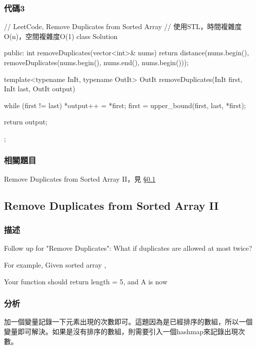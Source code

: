 \subsubsection{代碼3}
\begin{Code}
// LeetCode, Remove Duplicates from Sorted Array
// 使用STL，時間複雜度O(n)，空間複雜度O(1)
class Solution {
public:
    int removeDuplicates(vector<int>& nums) {
        return distance(nums.begin(), removeDuplicates(nums.begin(), nums.end(), nums.begin()));
    }

    template<typename InIt, typename OutIt>
    OutIt removeDuplicates(InIt first, InIt last, OutIt output) {
        while (first != last) {
            *output++ = *first;
            first = upper_bound(first, last, *first);
        }

        return output;
    }
};
\end{Code}


\subsubsection{相關題目}

\begindot
\item Remove Duplicates from Sorted Array II，見 \S \ref{sec:remove-duplicates-from-sorted-array-ii}
\myenddot


\subsection{Remove Duplicates from Sorted Array II}
\label{sec:remove-duplicates-from-sorted-array-ii}


\subsubsection{描述}
Follow up for "Remove Duplicates":
What if duplicates are allowed at most twice?

For example,
Given sorted array ,

Your function should return length = 5, and A is now \code{\[1,1,2,2,3\]}


\subsubsection{分析}
加一個變量記錄一下元素出現的次數即可。這題因為是已經排序的數組，所以一個變量即可解決。如果是沒有排序的數組，則需要引入一個hashmap來記錄出現次數。



